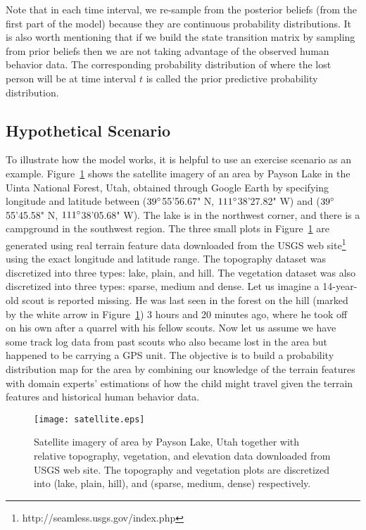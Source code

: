 Note that in each time interval, we re-sample from the posterior beliefs (from the first part of the model) because they are continuous probability distributions. It is also worth mentioning that if we build the state transition matrix by sampling from prior beliefs then we are not taking advantage of the observed human behavior data. The corresponding probability distribution of where the lost person will be at time interval $t$ is called the prior predictive probability distribution.

\subsection{Hypothetical Scenario}
\label{sec:3.2}

To illustrate how the model works, it is helpful to use an exercise scenario as an example. Figure~\ref{satellite} shows the satellite imagery of an area by Payson Lake in the Uinta National Forest, Utah, obtained through Google Earth by specifying longitude and latitude between ($39^\circ$55'56.67" N, $111^\circ$38'27.82" W) and ($39^\circ$55'45.58" N, $111^\circ$38'05.68" W). The lake is in the northwest corner, and there is a campground in the southwest region. The three small plots in Figure~\ref{satellite} are generated using real terrain feature data downloaded from the USGS web site\footnote {http://seamless.usgs.gov/index.php} using the exact longitude and latitude range. The topography dataset was discretized into three types: lake, plain, and hill. The vegetation dataset was also discretized into three types: sparse, medium and dense. Let us imagine a 14-year-old scout is reported missing. He was last seen in the forest on the hill (marked by the white arrow in Figure~\ref{satellite}) 3 hours and 20 minutes ago, where he took off on his own after a quarrel with his fellow scouts. Now let us assume we have some track log data from past scouts who also became lost in the area but happened to be carrying a GPS unit. The objective is to build a probability distribution map for the area by combining our knowledge of the terrain features with domain experts' estimations of how the child might travel given the terrain features and historical human behavior data.

\begin{figure}
\centering
\texttt{[image: satellite.eps]}
\caption[Satellite imagery and terrain data of area by Payson Lake, Utah]{Satellite imagery of area by Payson Lake, Utah together with relative topography, vegetation, and elevation data downloaded from USGS web site. The topography and vegetation plots are discretized into (lake, plain, hill), and (sparse, medium, dense) respectively.}
\label{satellite}
\end{figure}

